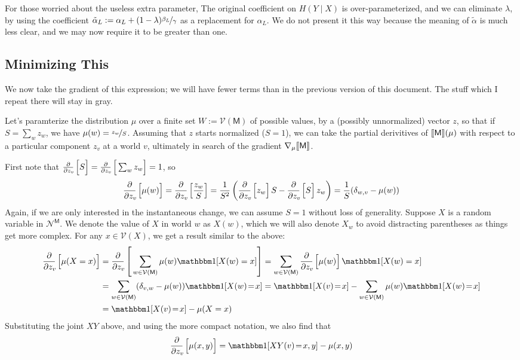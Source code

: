 \documentclass{article}
\newcommand{\V}{\mathcal V}
\newcommand{\N}{\mathcal N}
\newcommand{\sfM}{\mathsf M}
\begin{document}
	For those worried about the useless extra parameter, 
	The original coefficient on $H(Y \mid X)$ is over-parameterized, and we can eliminate $\lambda$, by using the coefficient $\tilde \alpha_L := \alpha_L + (1-\lambda) \nicefrac{\beta_L}{\gamma}$ as a replacement for $\alpha_L$. We do not present it this way because the meaning of $\tilde \alpha$ is much less clear, and we may now require it to be greater than one.

	
	\subsection{Minimizing This}
	We now take the gradient of this expression; we will have fewer terms than in the previous version of this document. The stuff which I repeat there will stay in gray.
	
	\def\pz#1{\frac{\partial}{\partial z_v\!}\left[\vphantom{\Big|}#1\right]}
	\begingroup\color{gray!50!black}
	Let's paramterize the distribution $\mu$ over a finite set $W := \V(\sfM)$ of possible values, by a (possibly unnormalized) vector $z$, so that if $S = \sum_{w} z_w$, we have $\mu(w) = \nicefrac{z_w}{S}$. Assuming that $z$ starts normalized ($S = 1$), we can take the partial derivitives of $\bbr{\sfM}(\mu)$ with respect to a particular component $z_v$ at a world $v$, ultimately in search of the gradient $\nabla_{\mu} \bbr{\sfM}$.
		
	First note that $\pz{S} = \pz{\sum_w z_w} = 1$, so
	\[ \pz{\mu(w)} = \pz{\frac{z_w}{S}} 
		= \frac{1}{S^2} \left(\pz{z_w} {S} - \pz{S}z_w \right) 
		= \frac{1}{S}(\delta_{w,v} - \mu(w))
	\]
	Again, if we are only interested in the instantaneous change, we can assume $S = 1$ without loss of generality.
	Suppose $X$ is a random variable in $\N^\sfM$. We denote the value of $X$ in world $w$ as $X(w)$, which we will also denote $X_w$ to avoid distracting parentheses as things get more complex. For any $x \in \V(X)$, we get a result similar to the above:
	\begin{align*} \pz{\mu(X = x)}
	  	&= \pz{\sum_{w \in \V(\sfM)} \mu(w) \mathbbm1[X(w) = x]}
	 	= \sum_{w \in \V(\sfM)} \pz{\mu(w)} \mathbbm1[X(w) = x] \\
	 	&= \sum_{w \in \V(\sfM)} (\delta_{v,w} - \mu(w)) \mathbbm1[X(w) \!=\! x]
	 	= \mathbbm1[X(v) \!=\! x] - \sum_{w \in \V(\sfM)} \mu(w) \mathbbm1[X(w) \!=\! x] \\
	 	&=  \mathbbm1[X(v) \!=\! x]  - \mu(X = x)
	\end{align*}
	Substituting the joint $XY$ above, and using the more compact notation, we also find that
	\[ \pz{\mu(x,y)} = \mathbbm1[XY(v) \!=\! x,y] - \mu(x,y) \] 
	
\end{document}
